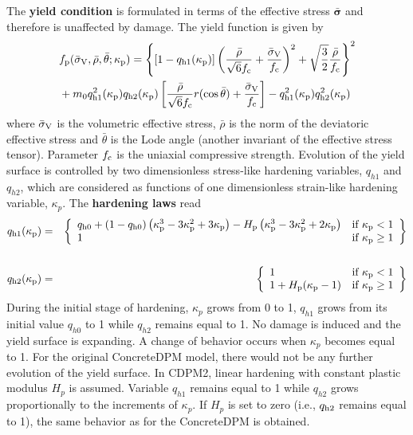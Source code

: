 \documentclass[a4paper]{article}
\begin{document}
The {\bf yield condition} is formulated in terms of the effective
stress $\bar{\boldsymbol{\sigma}}$ and therefore is unaffected by damage.
The yield function is given by
\begin{equation} \label{eqcdpm2:yieldSurface}    
\begin{split}
& f_{\rm p}(\bar{\sigma}_{\rm V},\bar\rho,\bar\theta;\kappa_{\rm p})=  \left\{\left[1-q_{\rm{h1}}(\kappa_{\rm p})\right]\left( \frac{\bar{\rho}} {\sqrt{6}f_{\rm c}} + \frac{\bar{\sigma}_{\rm V}} {f_{\rm c}} \right)^2 + \sqrt{\frac{3}{2}} \frac {\bar{\rho}}{f_{\rm c}} \right\}^2 \\
& +m_0 q^2_{\rm{h1}}(\kappa_{\rm p})q_{\rm{h2}}(\kappa_{\rm p}) \left[\frac{\bar{\rho} }{\sqrt{6}f_{\rm c}}r(\cos{\bar{\theta}}) + \frac{\bar{\sigma}_{\rm V}}{f_{\rm c}} \right] - q_{\rm{h1}}^2(\kappa_{\rm p}) q_{{\rm h2}}^2(\kappa_{\rm p})
\end{split}
\end{equation}
where $\bar\sigma_{\rm V}$ is the volumetric effective stress, $\bar\rho$ is the norm of the deviatoric effective stress
and $\bar\theta$ is the Lode angle (another invariant of the effective
stress tensor).
Parameter $f_{\rm c}$ is the uniaxial compressive strength.
Evolution of the
yield surface is controlled by two dimensionless stress-like hardening variables,
$q_{h1}$ and $q_{h2}$, which are considered as functions of one
dimensionless strain-like hardening variable, $\kappa_p$.
The {\bf hardening laws} read
\begin{eqnarray} \nonumber
q_{\rm h1}(\kappa_{\rm p}) &=& 
\left\{ \begin{array}{ll} q_{\rm h0} + \left(1-q_{\rm h0}\right) \left( \kappa_{\rm p}^3 - 3 \kappa_{\rm p}^2 + 3 \kappa_{\rm p} \right) - H_{\rm p} \left(\kappa_{\rm p}^3 - 3 \kappa_{\rm p}^2 + 2 \kappa_{\rm p}\right) & \mbox{if $\kappa_{\rm p} < 1$} \\
1 & \mbox{if $\kappa_{\rm p} \ge 1$}
\end{array}
\right\}
\\ \label{eq:hardeningLawOne} \\ 
q_{\rm h2}(\kappa_{\rm p}) &=& \left\{ \begin{array}{ll} 1 & \mbox{if $\kappa_{\rm p} < 1$} \\
1 + H_{\rm p} (\kappa_{\rm p} - 1)  & \mbox{if $\kappa_{\rm p} \ge 1$}
\end{array}
\right\}
\label{eq:hardeningLawTwo}
\end{eqnarray}
During the initial stage of
hardening, $\kappa_p$ grows from 0 to 1, $q_{h1}$ grows from
its initial value $q_{h0}$ to 1 while $q_{h2}$ remains equal to 1.
No damage is induced and the yield surface is expanding. A change
of behavior occurs when $\kappa_p$ becomes equal to 1. For the
original ConcreteDPM model, there would not be any further evolution
of the yield surface. In CDPM2, linear hardening with constant
plastic modulus $H_p$ is assumed. Variable $q_{h1}$ remains equal to 1
while $q_{h2}$ grows proportionally to the increments of $\kappa_p$.
If $H_p$ is set to zero (i.e., $q_{\rm h2}$ remains equal to 1),
the same behavior as for the ConcreteDPM is obtained.
\end{document}
